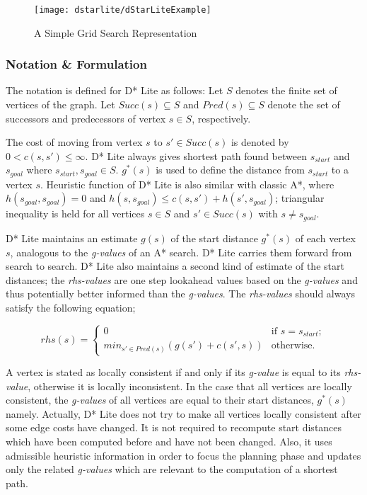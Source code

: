 \begin{figure}
\centering
\texttt{[image: dstarlite/dStarLiteExample]}
\caption{A Simple Grid Search Representation}
\label{fig:dStarLiteExample}
\end{figure}

\subsubsection{Notation \& Formulation}
The notation is defined for D* Lite as follows: Let $S$ denotes the finite set of vertices of the graph. Let $Succ(s) \subseteq S$ and $Pred(s) \subseteq S$ denote the set of successors and predecessors of vertex $s \in S$, respectively. 

The cost of moving from vertex $s$ to $s' \in Succ(s)$ is denoted by $0 < c(s, s') \leq \infty$. D* Lite always gives shortest path found between $s_{start}$ and $s_{goal}$ where $s_{start}, s_{goal} \in S$. $g^*(s)$ is used to define the distance from $s_{start}$ to a vertex $s$. Heuristic function of D* Lite is also similar with classic A*, where $h(s_{goal}, s_{goal}) = 0$ and $h(s, s_{goal}) \leq c(s, s') + h(s', s_{goal})$; triangular inequality is held for all vertices $s \in S$ and $s' \in Succ(s)$ with $s \neq s_{goal}$.

D* Lite maintains an estimate $g(s)$ of the start distance $g^*(s)$ of each vertex $s$, analogous to the \textit{g-values} of an A* search. D* Lite carries them forward from search to search. D* Lite also maintains a second kind of estimate of the start distances; the \textit{rhs-values} are one step lookahead values based on the \textit{g-values} and thus potentially better informed than the \textit{g-values}. The \textit{rhs-values} should always satisfy the following equation;

\[ rhs(s) = \left\{ \begin{array}{cc}
0 & \mbox{if $s=s_{start}$};\\
min_{s' \in Pred(s)}(g(s') + c(s', s)) & \mbox{otherwise}.\end{array} \right. \] 

A vertex is stated as locally consistent if and only if its \textit{g-value} is equal to its \textit{rhs-value}, otherwise it is locally inconsistent. In the case that all vertices are locally consistent, the \textit{g-values} of all vertices are equal to their start distances, $g^*(s)$ namely. Actually, D* Lite does not try to make all vertices locally consistent after some edge costs have changed. It is not required to recompute start distances which have been computed before and have not been changed. Also, it uses admissible heuristic information in order to focus the planning phase and updates only the related \textit{g-values} which are relevant to the computation of a shortest path.

